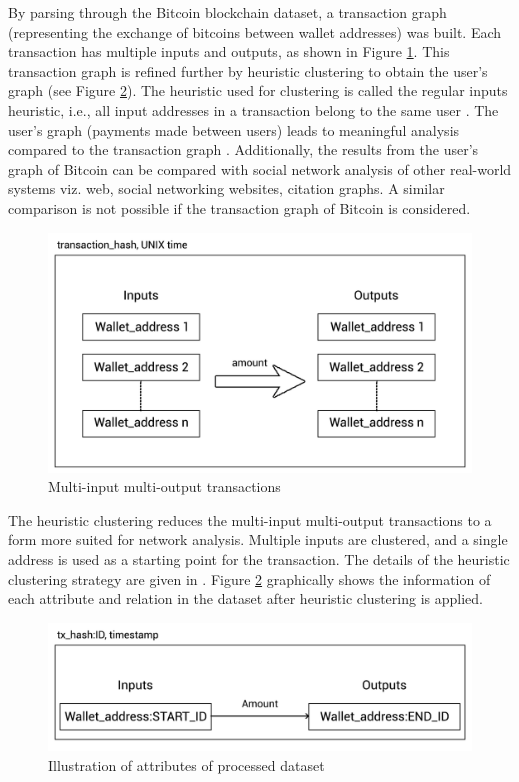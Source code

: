 \documentclass[preprint,12pt]{elsarticle}
\begin{document}
By parsing through the Bitcoin blockchain dataset, a transaction graph (representing the exchange of bitcoins between wallet addresses) was built. Each transaction has multiple inputs and outputs, as shown in Figure \ref{diag-trans}. This transaction graph is refined further by heuristic clustering to obtain the user's graph (see Figure \ref{diag-proc}). The heuristic used for clustering is called the regular inputs heuristic, i.e., all input addresses in a transaction belong to the same user \cite{nakamoto2019bitcoin, maesa2019bow}. The user's graph (payments made between users) leads to meaningful analysis compared to the transaction graph \cite{maesa2019bow, maesa2018graph, maesa2018data, maesa2016uncovering}. Additionally, the results from the user's graph of Bitcoin can be compared with social network analysis of other real-world systems viz. web, social networking websites, citation graphs. A similar comparison is not possible if the transaction graph of Bitcoin is considered.

\begin{figure}[!h]
\centering\includegraphics[width=0.4\linewidth]{1.png}
\caption{Multi-input multi-output transactions}
\label{diag-trans}
\end{figure}

The heuristic clustering reduces the multi-input multi-output transactions to a form more suited for network analysis. Multiple inputs are clustered, and a single address is used as a starting point for the transaction. The details of the heuristic clustering strategy are given in \cite{maesa2019bow, maesa2018graph, maesa2018data, maesa2016uncovering}. Figure \ref{diag-proc} graphically shows the information of each attribute and relation in the dataset after heuristic clustering is applied. 

\begin{figure}[!h]
\centering\includegraphics[width=0.6\linewidth]{2.png}
\caption{Illustration of attributes of processed dataset}
\label{diag-proc}
\end{figure}
\end{document}
